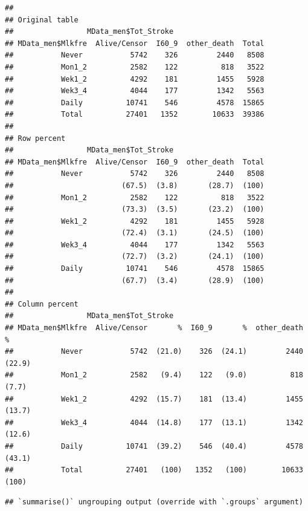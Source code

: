 \documentclass[
]{article}
\newenvironment{Shaded}{\begin{snugshade}}{\end{snugshade}}
\newcommand{\DataTypeTok}[1]{\textcolor[rgb]{0.13,0.29,0.53}{#1}}
\newcommand{\KeywordTok}[1]{\textcolor[rgb]{0.13,0.29,0.53}{\textbf{#1}}}
\newcommand{\NormalTok}[1]{#1}
\newcommand{\OperatorTok}[1]{\textcolor[rgb]{0.81,0.36,0.00}{\textbf{#1}}}
\newcommand{\StringTok}[1]{\textcolor[rgb]{0.31,0.60,0.02}{#1}}
\begin{document}
\begin{verbatim}
## 
## Original table 
##                 MData_men$Tot_Stroke
## MData_men$Mlkfre  Alive/Censor  I60_9  other_death  Total
##           Never           5742    326         2440   8508
##           Mon1_2          2582    122          818   3522
##           Wek1_2          4292    181         1455   5928
##           Wek3_4          4044    177         1342   5563
##           Daily          10741    546         4578  15865
##           Total          27401   1352        10633  39386
## 
## Row percent 
##                 MData_men$Tot_Stroke
## MData_men$Mlkfre  Alive/Censor  I60_9  other_death  Total
##           Never           5742    326         2440   8508
##                         (67.5)  (3.8)       (28.7)  (100)
##           Mon1_2          2582    122          818   3522
##                         (73.3)  (3.5)       (23.2)  (100)
##           Wek1_2          4292    181         1455   5928
##                         (72.4)  (3.1)       (24.5)  (100)
##           Wek3_4          4044    177         1342   5563
##                         (72.7)  (3.2)       (24.1)  (100)
##           Daily          10741    546         4578  15865
##                         (67.7)  (3.4)       (28.9)  (100)
## 
## Column percent 
##                 MData_men$Tot_Stroke
## MData_men$Mlkfre  Alive/Censor       %  I60_9       %  other_death       %
##           Never           5742  (21.0)    326  (24.1)         2440  (22.9)
##           Mon1_2          2582   (9.4)    122   (9.0)          818   (7.7)
##           Wek1_2          4292  (15.7)    181  (13.4)         1455  (13.7)
##           Wek3_4          4044  (14.8)    177  (13.1)         1342  (12.6)
##           Daily          10741  (39.2)    546  (40.4)         4578  (43.1)
##           Total          27401   (100)   1352   (100)        10633   (100)
\end{verbatim}

\begin{Shaded}
\end{Shaded}

\begin{verbatim}
## `summarise()` ungrouping output (override with `.groups` argument)
\end{verbatim}
\end{document}
